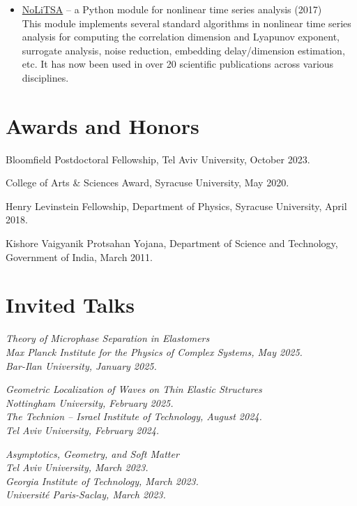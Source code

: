 \documentclass[10pt,article,oneside]{memoir}
\def\textsl#1{\bgroup\fontfamily{ppl}\selectfont\slshape{#1}\egroup}
\begin{document}
\begin{itemize}
\item \href{https://github.com/manu-mannattil/github}{NoLiTSA} -- a Python module for nonlinear time series analysis (2017)\\
  This module implements several standard algorithms in nonlinear time series analysis for computing the correlation dimension and Lyapunov exponent, surrogate analysis, noise reduction, embedding delay/dimension estimation, etc.
  It has now been used in over 20 scientific publications across various disciplines.
\end{itemize}


\section{Awards and Honors}

Bloomfield Postdoctoral Fellowship, Tel Aviv University, October 2023.

College of Arts \& Sciences Award, Syracuse University, May 2020.

Henry Levinstein Fellowship, Department of Physics, Syracuse University, April 2018.

Kishore Vaigyanik Protsahan Yojana, Department of Science and Technology, Government of India, March 2011.


\section{Invited Talks}

\textsl{Theory of Microphase Separation in Elastomers}\\
  Max Planck Institute for the Physics of Complex Systems, May 2025.\\
  Bar-Ilan University, January 2025.

\textsl{Geometric Localization of Waves on Thin Elastic Structures}\\
  Nottingham University, February 2025.\\
  The Technion -- Israel Institute of Technology, August 2024.\\
  Tel Aviv University, February 2024.

\textsl{Asymptotics, Geometry, and Soft Matter}\\
  Tel Aviv University, March 2023.\\
  Georgia Institute of Technology, March 2023.\\
  Universit\'{e} Paris-Saclay, March 2023.
\end{document}
